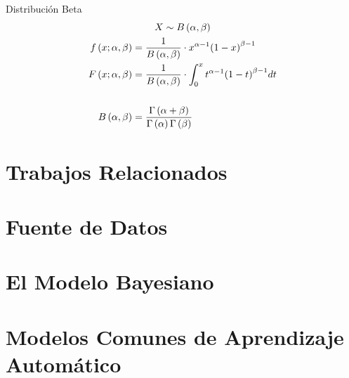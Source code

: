 \documentclass{beamer}
\begin{document}
\begin{frame}{Distribución Beta}
	\begin{gather*}
		X \sim B \left( \alpha, \beta \right) \\
		\begin{aligned}
			f \left( x; \alpha, \beta \right) &= \frac{1}{B \left(\alpha, \beta \right)} \cdot x^{\alpha - 1} {\left( 1 - x \right)}^{\beta - 1} \\
			F \left( x; \alpha, \beta \right) &= \frac{1}{B \left(\alpha, \beta \right)} \cdot \int^x_0 {t^{\alpha - 1} {\left( 1 - t \right)}^{\beta - 1} dt} \\
			\vspace{1em} \\
			B \left( \alpha, \beta \right) &= \frac{\Gamma \left( \alpha + \beta \right)}{\Gamma \left( \alpha \right) \Gamma \left( \beta \right)}
		\end{aligned}
	\end{gather*}
\end{frame}

\section{Trabajos Relacionados}

\begin{frame}
	
\end{frame}

\section{Fuente de Datos}

\begin{frame}
	
\end{frame}

\section{El Modelo Bayesiano}

\begin{frame}
	
\end{frame}

\section{Modelos Comunes de Aprendizaje Automático}

\begin{frame}
	
\end{frame}
\end{document}
